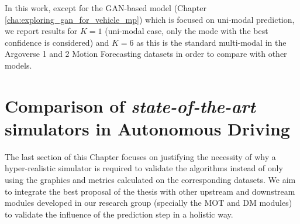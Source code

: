 In this work, except for the GAN-based model (Chapter \ref{cha:exploring_gan_for_vehicle_mp}) which is focused on uni-modal prediction, we report results for $K=1$ (uni-modal case, only the mode with the best confidence is considered) and $K=6$ as this is the standard multi-modal in the Argoverse 1 and 2 Motion Forecasting datasets in order to compare with other models.

\section{Comparison of \textit{state-of-the-art} simulators in Autonomous Driving}
\label{sec:2_sota_simulators_ad}

The last section of this Chapter focuses on justifying the necessity of why a hyper-realistic simulator is required to validate the algorithms instead of only using the graphics and metrics calculated on the corresponding datasets. We aim to integrate the best proposal of the thesis with other upstream and downstream modules developed in our research group (specially the \ac{MOT} and \ac{DM} modules) to validate the influence of the prediction step in a holistic way.



